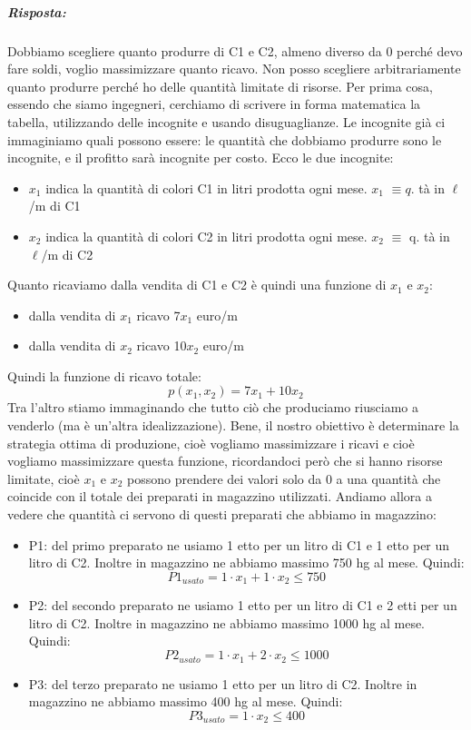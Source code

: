 \documentclass{article}
\begin{document}
\subparagraph{Risposta:} Dobbiamo scegliere quanto produrre di C1 e C2, almeno diverso da 0 perché devo fare soldi, voglio massimizzare quanto ricavo. Non posso scegliere arbitrariamente quanto produrre perché ho delle quantità limitate di risorse. Per prima cosa, essendo che siamo ingegneri, cerchiamo di scrivere in forma matematica la tabella, utilizzando delle incognite e usando disuguaglianze. Le incognite già ci immaginiamo quali possono essere: le quantità che dobbiamo produrre sono le incognite, e il profitto sarà incognite per costo. Ecco le due incognite:
\begin{itemize}
    \item $x_1$ indica la quantità di colori C1 in litri prodotta ogni mese. $x_1$ $\equiv q.$ tà in $\ell$/m di C1
    \item $x_2$ indica la quantità di colori C2 in litri prodotta ogni mese. $x_2$ $\equiv$ q. tà in $\ell$/m di C2
\end{itemize}
Quanto ricaviamo dalla vendita di C1 e C2 è quindi una funzione di $x_1$ e $x_2$:
\begin{itemize}
    \item dalla vendita di $x_1$ ricavo 7$x_1$ euro/m
    \item dalla vendita di $x_2$ ricavo 10$x_2$ euro/m
\end{itemize}
Quindi la funzione di ricavo totale:
\begin{equation*}
    p(x_1, x_2) = 7x_1 + 10x_2
\end{equation*}
Tra l'altro stiamo immaginando che tutto ciò che produciamo riusciamo a venderlo (ma è un'altra idealizzazione). Bene, il nostro obiettivo è determinare la strategia ottima di produzione, cioè vogliamo massimizzare i ricavi e cioè vogliamo massimizzare questa funzione, ricordandoci però che si hanno risorse limitate, cioè $x_1$ e $x_2$ possono prendere dei valori solo da 0 a una quantità che coincide con il totale dei preparati in magazzino utilizzati. Andiamo allora a vedere che quantità ci servono di questi preparati che abbiamo in magazzino:
\begin{itemize}
    \item P1: del primo preparato ne usiamo 1 etto per un litro di C1 e 1 etto per un litro di C2. Inoltre in magazzino ne abbiamo massimo 750 hg al mese. Quindi:
    \begin{equation*}
        P1_{usato} = 1 \cdot x_1 + 1 \cdot x_2 \leq 750
    \end{equation*}
    \item P2: del secondo preparato ne usiamo 1 etto per un litro di C1 e 2 etti per un litro di C2. Inoltre in magazzino ne abbiamo massimo 1000 hg al mese. Quindi:
    \begin{equation*}
        P2_{usato} = 1 \cdot x_1 + 2 \cdot x_2 \leq 1000
    \end{equation*}
    \item P3: del terzo preparato ne usiamo 1 etto per un litro di C2. Inoltre in magazzino ne abbiamo massimo 400 hg al mese. Quindi:
    \begin{equation*}
        P3_{usato} = 1 \cdot x_2 \leq 400
    \end{equation*}
\end{itemize}
\end{document}
